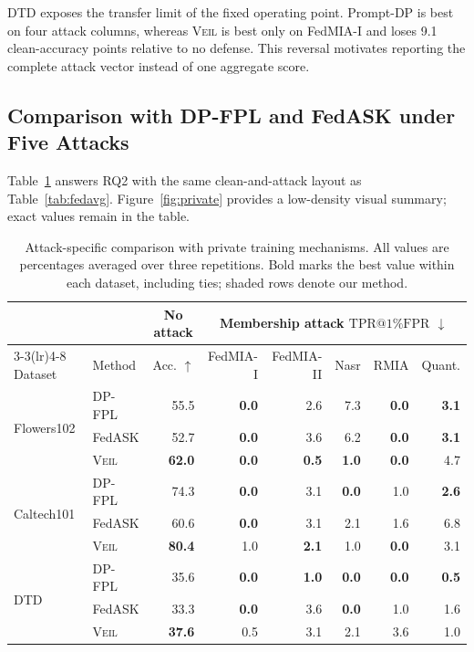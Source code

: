 \documentclass[letterpaper]{article}
\makeatletter
\newcommand{\method}{\textsc{Veil}}
\newcommand{\tpr}{\ensuremath{\mathrm{TPR}@1\%\mathrm{FPR}}}
\makeatother
\begin{document}
DTD exposes the transfer limit of the fixed operating point.  Prompt-DP is best
on four attack columns, whereas \method{} is best only on FedMIA-I and
loses 9.1 clean-accuracy points relative to no defense.  This reversal motivates
reporting the complete attack vector instead of one aggregate score.

\subsection{Comparison with DP-FPL and FedASK under Five Attacks}

Table~\ref{tab:private} answers RQ2 with the same clean-and-attack layout as
Table~\ref{tab:fedavg}.  Figure~\ref{fig:private} provides a low-density visual
summary; exact values remain in the table.

\begin{table}[t]
\centering
\small
\setlength{\tabcolsep}{5.0pt}
\begin{tabular}{llrrrrrr}
\toprule
& & \multicolumn{1}{c}{No attack} &
\multicolumn{5}{c}{Membership attack \tpr{} $\downarrow$}\\
\cmidrule(lr){3-3}\cmidrule(lr){4-8}
Dataset & Method & Acc. $\uparrow$ & FedMIA-I & FedMIA-II & Nasr & RMIA & Quant.\\
\midrule
\multirow{3}{*}{Flowers102}
& DP-FPL & 55.5 & \textbf{0.0} & 2.6 & 7.3 & \textbf{0.0} & \textbf{3.1}\\
& FedASK & 52.7 & \textbf{0.0} & 3.6 & 6.2 & \textbf{0.0} & \textbf{3.1}\\
\rowcolor{veilshade}
& \method{} & \textbf{62.0} & \textbf{0.0} & \textbf{0.5} & \textbf{1.0} & \textbf{0.0} & 4.7\\
\midrule
\multirow{3}{*}{Caltech101}
& DP-FPL & 74.3 & \textbf{0.0} & 3.1 & \textbf{0.0} & 1.0 & \textbf{2.6}\\
& FedASK & 60.6 & \textbf{0.0} & 3.1 & 2.1 & 1.6 & 6.8\\
\rowcolor{veilshade}
& \method{} & \textbf{80.4} & 1.0 & \textbf{2.1} & 1.0 & \textbf{0.0} & 3.1\\
\midrule
\multirow{3}{*}{DTD}
& DP-FPL & 35.6 & \textbf{0.0} & \textbf{1.0} & \textbf{0.0} & \textbf{0.0} & \textbf{0.5}\\
& FedASK & 33.3 & \textbf{0.0} & 3.6 & \textbf{0.0} & 1.0 & 1.6\\
\rowcolor{veilshade}
& \method{} & \textbf{37.6} & 0.5 & 3.1 & 2.1 & 3.6 & 1.0\\
\bottomrule
\end{tabular}
\caption{Attack-specific comparison with private training mechanisms.  All
values are percentages averaged over three repetitions.  Bold marks the best
value within each dataset, including ties; shaded rows denote our method.}
\label{tab:private}
\end{table}
\end{document}
